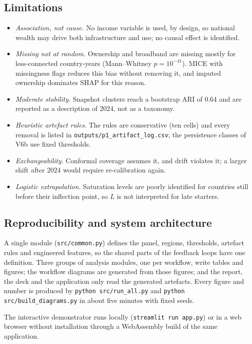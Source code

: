 \documentclass[conference,a4paper]{IEEEtran}
\begin{document}
\subsection{Limitations}\label{sec:limits}
\begin{itemize}
\item \textit{Association, not cause.} No income variable is used, by design, so national wealth
  may drive both infrastructure and use; no causal effect is identified.
\item \textit{Missing not at random.} Ownership and broadband are missing mostly for less-connected
  country-years (Mann--Whitney $p=10^{-41}$). MICE with missingness flags reduces this bias without removing it, and
  imputed ownership dominates SHAP for this reason.
\item \textit{Moderate stability.} Snapshot clusters reach a bootstrap ARI of 0.64 and are reported
  as a description of 2024, not as a taxonomy.
\item \textit{Heuristic artefact rules.} The rules are conservative (ten cells) and every removal is
  listed in \texttt{outputs/p1\_artifact\_log.csv}; the persistence classes of V6b use fixed thresholds.
\item \textit{Exchangeability.} Conformal coverage assumes it, and drift violates it; a larger shift
  after 2024 would require re-calibration again.
\item \textit{Logistic extrapolation.} Saturation levels are poorly identified for countries still
  before their inflection point, so $L$ is not interpreted for late starters.
\end{itemize}

\subsection{Reproducibility and system architecture}\label{sec:repro}
A single module (\texttt{src/common.py})
defines the panel, regions, thresholds, artefact rules and engineered features, so the shared parts of
the feedback loops have one definition. Three groups of analysis modules, one per workflow, write tables
and figures; the workflow diagrams are generated from those figures; and the report, the deck and the
application only read the generated artefacts. Every figure and number is produced by
\texttt{python src/run\_all.py} and \texttt{python src/build\_diagrams.py} in about five minutes with
fixed seeds.

The interactive
demonstrator runs locally (\texttt{streamlit run app.py}) or in a web browser without installation
through a WebAssembly build of the same application.
\end{document}
